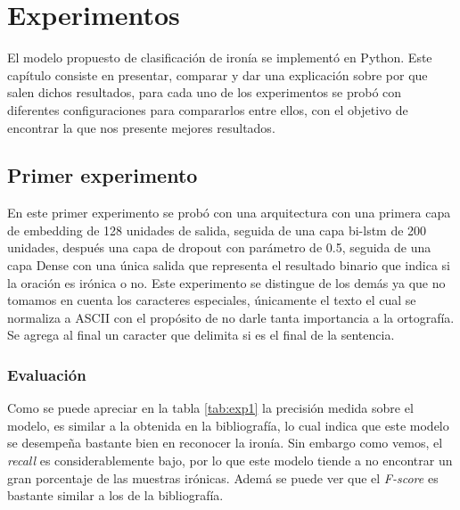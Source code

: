 \chapter{Experimentos}\label{cap.experimentos}
	
	
    \par El modelo propuesto de clasificación de ironía se implementó en Python. Este capítulo consiste en presentar, comparar y dar una explicación sobre por que salen dichos resultados, para cada uno de los experimentos se probó con diferentes configuraciones para compararlos entre ellos, con el objetivo de encontrar la que nos presente mejores resultados.
	
	\section{Primer experimento}
	    
	    \par En este primer experimento se probó con una arquitectura con una primera capa de embedding de 128 unidades de salida, seguida de una capa \gls{bi-lstm} de 200 unidades, después una capa de dropout con parámetro de 0.5, seguida de una capa Dense con una única salida que representa el resultado binario que indica si la oración es irónica o no. Este experimento se distingue de los demás ya que no tomamos en cuenta los caracteres especiales, únicamente el texto el cual se normaliza a ASCII con el propósito de no darle tanta importancia a la ortografía. Se agrega al final un caracter que delimita si es el final de la sentencia.
	    
		\subsection{Evaluación}
		     \begin{center}
		        
		     \end{center}
		     
		 \par Como se puede apreciar en la tabla \ref{tab:exp1} la precisión medida sobre el modelo, es similar a la obtenida en la bibliografía, lo cual indica que este modelo se desempeña bastante bien en reconocer la ironía. Sin embargo como vemos, el \textit{recall} es considerablemente bajo, por lo que este modelo tiende a no encontrar un gran porcentaje de las muestras irónicas. Ademá se puede ver que el \textit{F-score} es bastante similar a los de la bibliografía.
		 
